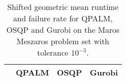 \documentclass{amsart}
\begin{document}
\begin{table}
	\centering
	\begin{tabular}{l|ccc}
		& QPALM & OSQP & Gurobi \\ \hline
		
	\end{tabular}
	\caption{\small Shifted geometric mean runtime and failure rate for QPALM, OSQP and Gurobi on the Maros Meszaros problem set with tolerance \(10^{-3}\).}
	
\end{table}
\end{document}
